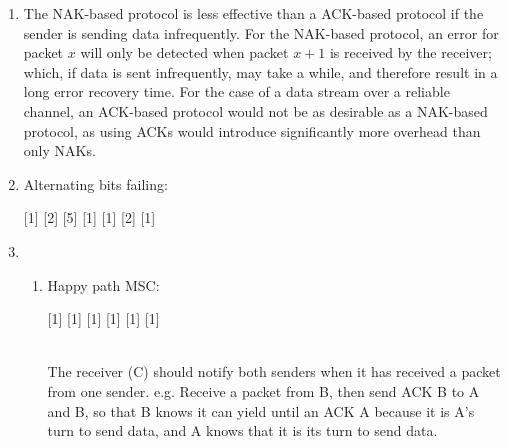 \documentclass{article}
\begin{document}
\begin{enumerate}
\item The NAK-based protocol is less effective than a ACK-based protocol if the sender is sending data infrequently. For the NAK-based protocol, an error for packet $ x $ will only be detected when packet $ x + 1 $ is received by the receiver; which, if data is sent infrequently, may take a while, and therefore result in a long error recovery time. For the case of a data stream over a reliable channel, an ACK-based protocol would not be as desirable as a NAK-based protocol, as using ACKs would introduce significantly more overhead than only NAKs.

\item Alternating bits failing:

\begin{msc}{}
\setlength{\envinstdist}{2.8\envinstdist}


[1]
\nextlevel
{}
\nextlevel
{}[2]
\nextlevel
{}[5]
\nextlevel
{}
[1]
\nextlevel
{}
\nextlevel
{}[1]
\nextlevel
{}
\nextlevel
{}
[2]
\nextlevel
{}[1]
\nextlevel
{}

\end{msc}

\item
\begin{enumerate}
\item Happy path MSC: \\
\begin{msc}{}
\setlength{\envinstdist}{2.5\envinstdist}


[1]
\nextlevel
{}[1]
[1]
\nextlevel
\nextlevel
{}[1]
\nextlevel
{}[1]
[1]
\nextlevel

\end{msc}\\
The receiver (C) should notify both senders when it has received a packet from one sender. e.g. Receive a packet from B, then send ACK B to A and B, so that B knows it can yield until an ACK A because it is A's turn to send data, and A knows that it is its turn to send data.\\


\end{enumerate}
\end{enumerate}
\end{document}
